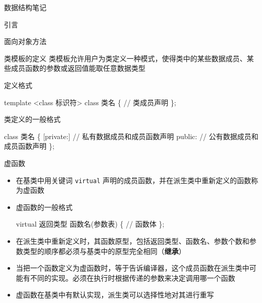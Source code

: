\documentclass[
  ignorenonframetext,
]{beamer}
\newenvironment{Shaded}{}{}
\newcommand{\NormalTok}[1]{#1}
\begin{document}
\begin{frame}[fragile]{数据结构笔记}
\begin{block}{引言}
\begin{block}{面向对象方法}
\protect{}\label{ux9762ux5411ux5bf9ux8c61ux65b9ux6cd5}
\begin{block}{类模板的定义}
\protect{}\label{ux7c7bux6a21ux677fux7684ux5b9aux4e49}
类模板允许用户为类定义一种模式，使得类中的某些数据成员、某些成员函数的参数或返回值能取任意数据类型

\begin{block}{定义格式}
\protect{}\label{ux5b9aux4e49ux683cux5f0f}
\begin{Shaded}
\begin{Highlighting}[]
\NormalTok{template \textless{}class 标识符\textgreater{}}
\NormalTok{class 类名}
\NormalTok{\{}
\NormalTok{    // 类成员声明}
\NormalTok{\};}
\end{Highlighting}
\end{Shaded}
\end{block}

\begin{block}{类定义的一般格式}
\protect{}\label{ux7c7bux5b9aux4e49ux7684ux4e00ux822cux683cux5f0f}
\begin{Shaded}
\begin{Highlighting}[]
\NormalTok{class 类名}
\NormalTok{\{}
\NormalTok{  [private:]}
\NormalTok{    // 私有数据成员和成员函数声明}
\NormalTok{  public:}
\NormalTok{    // 公有数据成员和成员函数声明}
\NormalTok{\};}
\end{Highlighting}
\end{Shaded}
\end{block}
\end{block}

\begin{block}{虚函数}
\protect{}\label{ux865aux51fdux6570}
\begin{itemize}
\item
  在基类中用关键词 \texttt{virtual}
  声明的成员函数，并在派生类中重新定义的函数称为虚函数
\item
  虚函数的一般格式

\begin{Shaded}
\begin{Highlighting}[]
\NormalTok{virtual 返回类型 函数名(参数表)}
\NormalTok{\{}
\NormalTok{  // 函数体}
\NormalTok{\};}
\end{Highlighting}
\end{Shaded}
\item
  在派生类中重新定义时，其函数原型，包括返回类型、函数名、参数个数和参数类型的顺序都必须与基类中的原型完全相同（\textbf{继承}）
\item
  当把一个函数定义为虚函数时，等于告诉编译器，这个成员函数在派生类中可能有不同的实现。必须在执行时根据传递的参数来决定调用哪一个函数
\item
  虚函数在基类中有默认实现，派生类可以选择性地对其进行重写
\end{itemize}
\end{block}


\end{block}
\end{block}
\end{frame}
\end{document}
